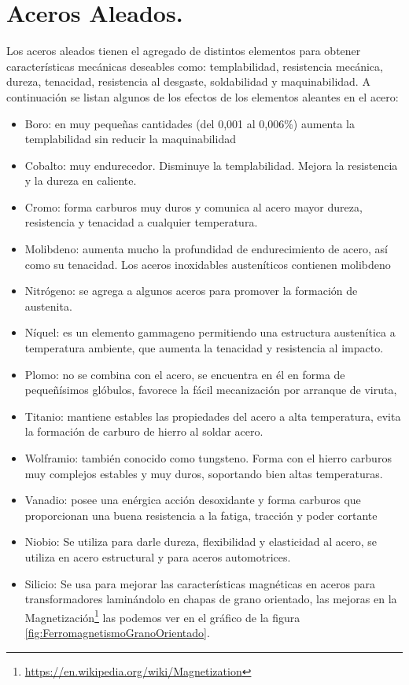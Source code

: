 \section{Aceros Aleados.}

Los aceros aleados tienen el agregado de distintos elementos para obtener características mecánicas deseables como: templabilidad, resistencia mecánica, dureza, tenacidad, resistencia al desgaste, soldabilidad y maquinabilidad. A continuación se listan algunos de los efectos de los elementos aleantes en el acero:
\begin{itemize}
	\item Boro: en muy pequeñas cantidades (del 0,001 al 0,006\%) aumenta la templabilidad sin reducir la maquinabilidad
	\item Cobalto: muy endurecedor. Disminuye la templabilidad. Mejora la resistencia y la dureza en caliente.
	\item Cromo: forma carburos muy duros y comunica al acero mayor dureza, resistencia y tenacidad a cualquier temperatura. 
	\item Molibdeno: aumenta mucho la profundidad de endurecimiento de acero, así como su tenacidad. Los aceros inoxidables austeníticos contienen molibdeno
	\item Nitrógeno: se agrega a algunos aceros para promover la formación de austenita.
	\item Níquel: es un elemento gammageno permitiendo una estructura austenítica a temperatura ambiente, que aumenta la tenacidad y resistencia al impacto. 
	\item Plomo: no se combina con el acero, se encuentra en él en forma de pequeñísimos glóbulos, favorece la fácil mecanización por arranque de viruta, 			
	\item Titanio: mantiene estables las propiedades del acero a alta temperatura, evita la formación de carburo de hierro al soldar acero.
 	\item Wolframio: también conocido como tungsteno. Forma con el hierro carburos muy complejos estables y muy duros, soportando bien altas temperaturas. 
 	\item Vanadio: posee una enérgica acción desoxidante y forma carburos que proporcionan una buena resistencia a la fatiga, tracción y poder cortante
 	\item Niobio: Se utiliza para darle dureza, flexibilidad y elasticidad al acero, se utiliza en acero estructural y para aceros automotrices.
 	\item Silicio: Se usa para mejorar las características magnéticas en aceros para transformadores laminándolo en chapas de grano orientado, las mejoras en la Magnetización\footnote{\url{https://en.wikipedia.org/wiki/Magnetization}} las podemos ver en el gráfico de la figura \ref{fig:FerromagnetismoGranoOrientado}. 
\end{itemize}


